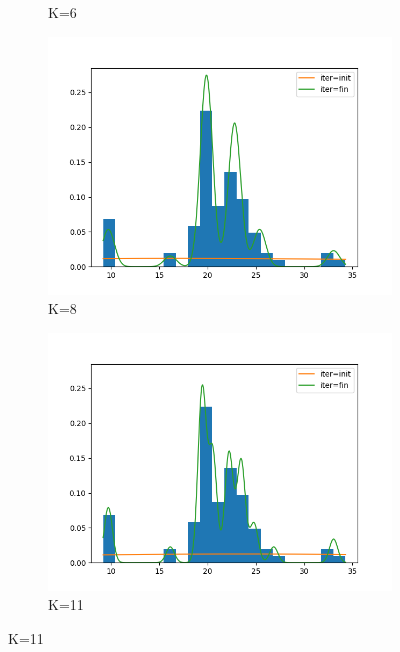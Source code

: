 \begin{figure}
\begin{subfigure}[b]{0.3\textwidth}
         \caption{K=6}
         \label{fig:Stoch_loc_only6}
     \end{subfigure}
     \hfill
     \begin{subfigure}[b]{0.3\textwidth}
         \centering
         \includegraphics[width=\textwidth]{../code/stochastic_loc_only_plots/galaxies_hist_k_8.png}
         \caption{K=8}
         \label{fig:Stoch_loc_only8}
     \end{subfigure}
     \begin{subfigure}[b]{0.3\textwidth}
         \centering
         \includegraphics[width=\textwidth]{../code/stochastic_loc_only_plots/galaxies_hist_k_11.png}
         \caption{K=11}
         \label{fig:Stoch_loc_only11}
     \end{subfigure}

\end{figure}
